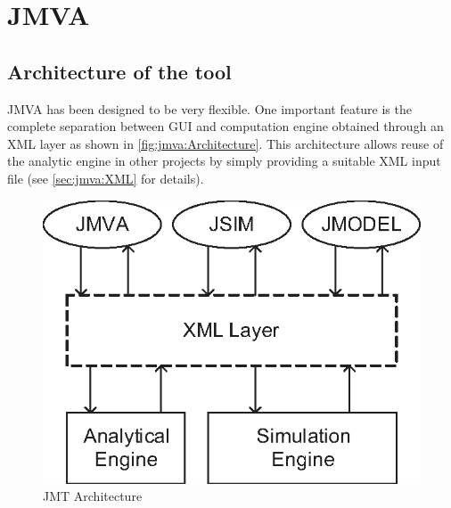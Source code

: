 %
%
%
%
%
\chapter{JMVA}
\label{cha:jmva}
\section{Architecture of the tool}
JMVA has been designed to be very flexible. One important feature is
the complete separation between GUI and computation engine obtained
through an XML layer as shown in \autoref{fig:jmva:Architecture}.
This architecture allows reuse of the analytic engine in other
projects by simply providing a suitable XML input file (see
\autoref{sec:jmva:XML} for details).

\begin{figure}[htbp]
    \begin{center}
        \includegraphics[scale=.65]{img/jmva/Architecture}
    \end{center}
    \caption{JMT Architecture}
    \label{fig:jmva:Architecture}
\end{figure}

